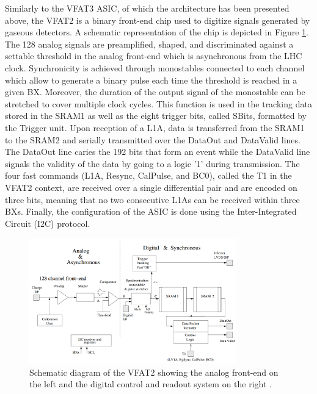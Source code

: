       Similarly to the VFAT3 ASIC, of which the architecture has been presented above, the VFAT2 is a binary front-end chip used to digitize signals generated by gaseous detectors. A schematic representation of the chip is depicted in Figure \ref{fig:II-2-vfat2}. The 128 analog signals are preamplified, shaped, and discriminated against a settable threshold in the analog front-end which is asynchronous from the LHC clock. Synchronicity is achieved through monostables connected to each channel which allow to generate a binary pulse each time the threshold is reached in a given BX. Moreover, the duration of the output signal of the monostable can be stretched to cover multiple clock cycles. This function is used in the tracking data stored in the SRAM1 as well as the eight trigger bits, called SBits, formatted by the Trigger unit. Upon reception of a L1A, data is transferred from the SRAM1 to the SRAM2 and serially transmitted over the DataOut and DataValid lines. The DataOut line caries the 192 bits that form an event while the DataValid line signals the validity of the data by going to a logic '1' during transmission. The four fast commands (L1A, Resync, CalPulse, and BC0), called the T1 in the VFAT2 context, are received over a single differential pair and are encoded on three bits, meaning that no two consecutive L1As can be received within three BXs. Finally, the configuration of the ASIC is done using the Inter-Integrated Circuit (I2C) protocol. \\

      \begin{figure}[t!]
        \centering
        \includegraphics[width=0.8\textwidth]{img/II-2-daq/vfat2.png}
        \caption{Schematic diagram of the VFAT2 showing the analog front-end on the left and the digital control and readout system on the right \cite{Aspell:1069906}.}
        \label{fig:II-2-vfat2}
      \end{figure}

